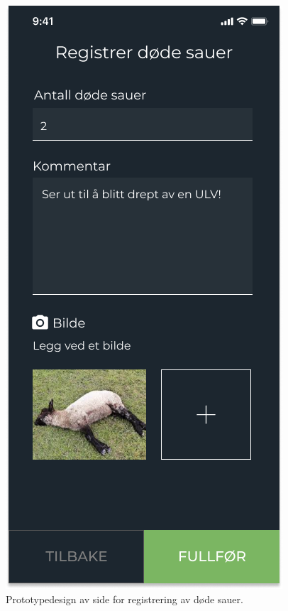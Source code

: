 \begin{figure}[H]
\centering
\captionsetup{width=.8\linewidth}
\includegraphics[scale=0.4]{Figurer/Figma/Frame 2.2b.1 - Registrer-dode-sauer.png}
\caption{Prototypedesign av side for registrering av døde sauer.}
\label{fig:figma-registrer-dode-sauer}
\end{figure}

